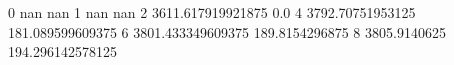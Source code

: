 0 nan nan
1 nan nan
2 3611.617919921875 0.0
4 3792.70751953125 181.089599609375
6 3801.433349609375 189.8154296875
8 3805.9140625 194.296142578125
